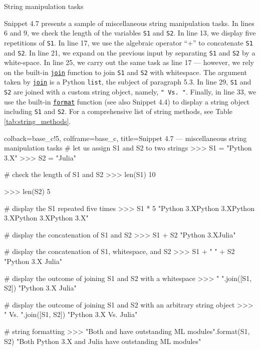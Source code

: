 \documentclass[a4paper,11pt]{book}
\numberwithin{figure}{chapter}
\numberwithin{table}{chapter}
\newcommand{\question}[1]{%
    \begin{tcolorbox}[colback=comp_c!10,colframe=comp_c,sidebyside align=top,width=\linewidth,before skip=1ex]
        #1
    \end{tcolorbox}
    \switchcolumn%
}
\newcommand{\note}[1]{%
    \begin{tcolorbox}[colback=white!0,colframe=white!10,width=\linewidth,before skip=1ex]
        #1
    \end{tcolorbox}
}
\begin{document}
\begin{paracol}{2}
	\question{\raggedright String manipulation tasks}
		\note{Snippet 4.7 presents a sample of miscellaneous string manipulation tasks. In lines 6 and 9, we check the length of the variables \texttt{S1} and \texttt{S2}. In line 13, we display five repetitions of \texttt{S1}. In line 17, we use the algebraic operator ``$+$'' to concatenate \texttt{S1} and \texttt{S2}. In line 21, we expand on the previous input by separating \texttt{S1} and \texttt{S2} by a white-space. In line 25, we carry out the same task as line 17 --- however, we rely on the built-in \href{https://docs.python.org/3/library/stdtypes.html\#str.join}{\texttt{join}} function to join \texttt{S1} and \texttt{S2} with whitespace. The argument taken by \href{https://docs.python.org/3/library/stdtypes.html\#str.join}{\texttt{join}} is a Python \texttt{list}, the subject of paragraph 5.3. In line 29, \texttt{S1} and \texttt{S2} are joined with a custom string object, namely, \texttt{" Vs. "}. Finally, in line 33, we use the built-in \href{https://docs.python.org/3/library/stdtypes.html\#str.format}{\texttt{format}} function (see also Snippet 4.4) to display a string object including \texttt{S1} and \texttt{S2}. For a comprehensive list of string methods, see Table \ref{tab:string_methods}.}
\end{paracol}
\clearpage

\begin{pythoncode}[linenos=true,]{colback=base_c!5, colframe=base_c, title=\sffamily Snippet 4.7 --- miscellaneous string manipulation tasks}
# let us assign S1 and S2 to two strings
>>> S1 = "Python 3.X"
>>> S2 = "Julia"

# check the length of S1 and S2
>>> len(S1)
10

>>> len(S2)
5

# display the S1 repeated five times
>>> S1 * 5
"Python 3.XPython 3.XPython 3.XPython 3.XPython 3.X"

# display the concatenation of S1 and S2
>>> S1 + S2
"Python 3.XJulia"

# display the concatenation of S1, whitespace, and S2
>>> S1 + " " + S2
"Python 3.X Julia"

# display the outcome of joining S1 and S2 with a whitespace
>>> " ".join([S1, S2])
"Python 3.X Julia"

# display the outcome of joining S1 and S2 with an arbitrary string object
>>> " Vs. ".join([S1, S2])
"Python 3.X Vs. Julia"

# string formatting
>>> "Both {} and {} have outstanding ML modules".format(S1, S2) 
"Both Python 3.X and Julia have outstanding ML modules"
\end{pythoncode}
\clearpage
\end{document}
